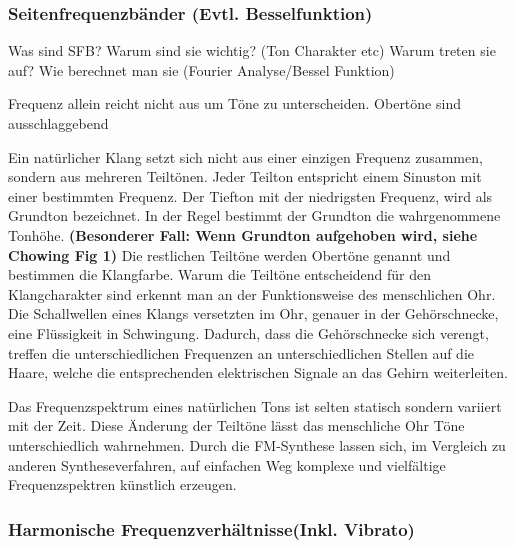 \subsubsection{Seitenfrequenzbänder (Evtl. Besselfunktion)}
Was sind SFB?
Warum sind sie wichtig? (Ton Charakter etc)
Warum treten sie auf?
Wie berechnet man sie (Fourier Analyse/Bessel Funktion)

Frequenz allein reicht nicht aus um Töne zu unterscheiden. Obertöne sind ausschlaggebend 


Ein natürlicher Klang setzt sich nicht aus einer einzigen Frequenz zusammen, sondern aus mehreren Teiltönen. Jeder Teilton entspricht einem Sinuston mit einer bestimmten Frequenz. Der Tiefton mit der niedrigsten Frequenz, wird als Grundton bezeichnet. In der Regel bestimmt der Grundton die wahrgenommene Tonhöhe. \textbf{(Besonderer Fall: Wenn Grundton aufgehoben wird, siehe Chowing Fig 1)} Die restlichen Teiltöne werden Obertöne genannt und bestimmen die Klangfarbe. Warum die Teiltöne entscheidend für den Klangcharakter sind erkennt man an der Funktionsweise des menschlichen Ohr. Die Schallwellen eines Klangs versetzten im Ohr, genauer in der Gehörschnecke, eine Flüssigkeit in Schwingung. Dadurch, dass die Gehörschnecke sich verengt, treffen die unterschiedlichen Frequenzen an unterschiedlichen Stellen auf die Haare, welche die entsprechenden elektrischen Signale an das Gehirn weiterleiten.




Das Frequenzspektrum eines natürlichen Tons ist selten statisch sondern variiert mit der Zeit. Diese Änderung der Teiltöne lässt das menschliche Ohr Töne unterschiedlich wahrnehmen. Durch die FM-Synthese lassen sich, im Vergleich zu anderen Syntheseverfahren, auf einfachen Weg komplexe und vielfältige Frequenzspektren künstlich erzeugen.


\subsubsection{Harmonische Frequenzverhältnisse(Inkl. Vibrato)}